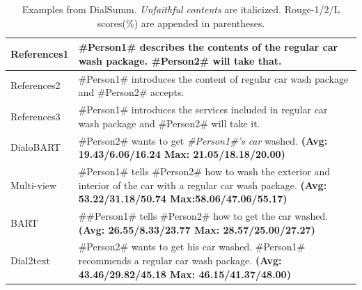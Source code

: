 \documentclass[letterpaper]{article} %
\begin{document}
\begin{table}
\begin{tabular}{p{1.5cm}p{14.5cm}}
		\hline
		References1&  \#Person1\# describes the contents of the regular car wash package. \#Person2\# will take that.\\
		\hline
		References2&  \#Person1\# introduces the content of regular car wash package and \#Person2\# accepts.\\
		\hline
		References3&  \#Person1\# introduces the services included in regular car wash package and \#Person2\# will take it.\\
		\hline
		DialoBART&  \#Person2\# wants to get \textit{\#Person1\#'s car} washed. \textbf{(Avg: 19.43/6.06/16.24 Max: 21.05/18.18/20.00)}\\
		\hline
		Multi-view&  \#Person1\# tells \#Person2\# how to wash the exterior and interior of the car with a regular car wash package. \textbf{(Avg: 53.22/31.18/50.74 Max:58.06/47.06/55.17)}\\
		\hline
		BART&  \#\#Person1\# tells \#Person2\# how to get the car washed. \textbf{(Avg: 26.55/8.33/23.77 Max: 28.57/25.00/27.27)}\\		
		\hline
		Dial2text& \#Person2\# wants to get his car washed. \#Person1\# recommends a regular car wash package. \textbf{(Avg: 43.46/29.82/45.18 Max: 46.15/41.37/48.00)}\\
		
		\bottomrule[1pt]
	\end{tabular}
	
	\caption{Examples from DialSumm. \textit{Unfaithful contents} are italicized. Rouge-1/2/L scores(\%) are appended in parentheses.}
	\label{tab:dialsummcase1}  
\end{table}
\end{document}
